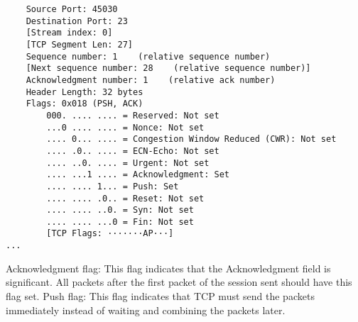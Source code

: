 \begin{verbatim}
    Source Port: 45030
    Destination Port: 23
    [Stream index: 0]
    [TCP Segment Len: 27]
    Sequence number: 1    (relative sequence number)
    [Next sequence number: 28    (relative sequence number)]
    Acknowledgment number: 1    (relative ack number)
    Header Length: 32 bytes
    Flags: 0x018 (PSH, ACK)
        000. .... .... = Reserved: Not set
        ...0 .... .... = Nonce: Not set
        .... 0... .... = Congestion Window Reduced (CWR): Not set
        .... .0.. .... = ECN-Echo: Not set
        .... ..0. .... = Urgent: Not set
        .... ...1 .... = Acknowledgment: Set
        .... .... 1... = Push: Set
        .... .... .0.. = Reset: Not set
        .... .... ..0. = Syn: Not set
        .... .... ...0 = Fin: Not set
        [TCP Flags: ·······AP···]
...
\end{verbatim}

Acknowledgment flag: This flag indicates that the Acknowledgment field is significant. All packets after the first packet of the session sent should have this flag set.
Push flag: This flag indicates that TCP must send the packets immediately instead of waiting and combining the packets later.